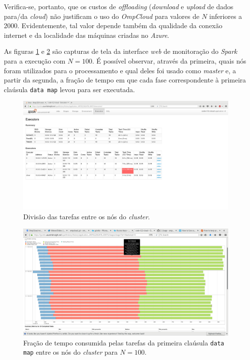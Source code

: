 \documentclass[12pt, a4paper]{article}
\begin{document}
Verifica-se, portanto, que os custos de \textit{offloading} (\textit{download}
e \textit{upload} de dados para/da \textit{cloud}) não justificam o uso do
\textit{OmpCloud} para valores de \(N\) inferiores a 2000. Evidentemente, tal
valor depende também da qualidade da conexão internet e da localidade das máquinas
criadas no \textit{Azure}.

\vspace{12pt}

As figuras \ref{fig:nodes} e \ref{fig:event} são capturas de tela da
interface \textit{web} de monitoração do \textit{Spark} para a execução com \(N=100\). É possível
observar, através da primeira, quais nós foram utilizados para o processamento
e qual deles foi usado como \textit{master} e, a partir da segunda, a fração de
tempo em que cada fase correspondente à primeira claúsula \texttt{data map}
levou para ser executada.

\begin{figure}[h!] 
    \centering
    \includegraphics[width=\textwidth]{img/100/executors}
    \caption{Divisão das tarefas entre os nós do \textit{cluster}.}        
    \label{fig:nodes}
\end{figure}

\begin{figure}[h!] 
    \centering
    \includegraphics[width=\textwidth]{img/100/event}
    \caption{Fração de tempo consumida pelas tarefas da primeira claúsula
    \texttt{data map} entre os nós do \textit{cluster} para \(N = 100\).}
    \label{fig:event}
\end{figure}
\end{document}
